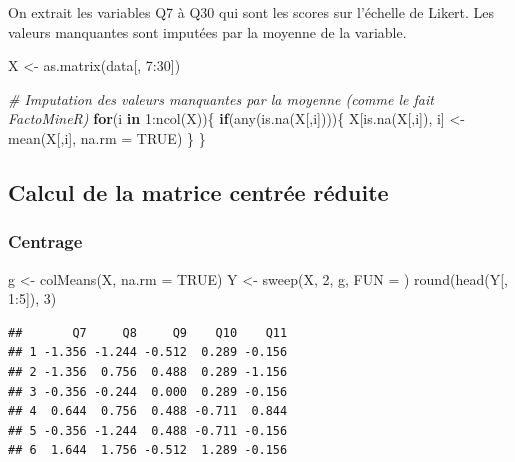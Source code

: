 \documentclass[
]{article}
\newenvironment{Shaded}{\begin{snugshade}}{\end{snugshade}}
\newcommand{\AttributeTok}[1]{\textcolor[rgb]{0.77,0.63,0.00}{#1}}
\newcommand{\CommentTok}[1]{\textcolor[rgb]{0.56,0.35,0.01}{\textit{#1}}}
\newcommand{\ConstantTok}[1]{\textcolor[rgb]{0.00,0.00,0.00}{#1}}
\newcommand{\ControlFlowTok}[1]{\textcolor[rgb]{0.13,0.29,0.53}{\textbf{#1}}}
\newcommand{\DecValTok}[1]{\textcolor[rgb]{0.00,0.00,0.81}{#1}}
\newcommand{\FunctionTok}[1]{\textcolor[rgb]{0.00,0.00,0.00}{#1}}
\newcommand{\NormalTok}[1]{#1}
\newcommand{\OtherTok}[1]{\textcolor[rgb]{0.56,0.35,0.01}{#1}}
\newcommand{\SpecialCharTok}[1]{\textcolor[rgb]{0.00,0.00,0.00}{#1}}
\newcommand{\StringTok}[1]{\textcolor[rgb]{0.31,0.60,0.02}{#1}}
\begin{document}
On extrait les variables Q7 à Q30 qui sont les scores sur l'échelle de
Likert. Les valeurs manquantes sont imputées par la moyenne de la
variable.

\begin{Shaded}
\begin{Highlighting}[]
\NormalTok{X }\OtherTok{\textless{}{-}} \FunctionTok{as.matrix}\NormalTok{(data[, }\DecValTok{7}\SpecialCharTok{:}\DecValTok{30}\NormalTok{])}

\CommentTok{\# Imputation des valeurs manquantes par la moyenne (comme le fait FactoMineR)}
\ControlFlowTok{for}\NormalTok{(i }\ControlFlowTok{in} \DecValTok{1}\SpecialCharTok{:}\FunctionTok{ncol}\NormalTok{(X))\{}
  \ControlFlowTok{if}\NormalTok{(}\FunctionTok{any}\NormalTok{(}\FunctionTok{is.na}\NormalTok{(X[,i])))\{}
\NormalTok{    X[}\FunctionTok{is.na}\NormalTok{(X[,i]), i] }\OtherTok{\textless{}{-}} \FunctionTok{mean}\NormalTok{(X[,i], }\AttributeTok{na.rm =} \ConstantTok{TRUE}\NormalTok{)}
\NormalTok{  \}}
\NormalTok{\}}
\end{Highlighting}
\end{Shaded}

\hypertarget{calcul-de-la-matrice-centruxe9e-ruxe9duite}{%
\subsection{Calcul de la matrice centrée
réduite}\label{calcul-de-la-matrice-centruxe9e-ruxe9duite}}

\hypertarget{centrage}{%
\subsubsection{Centrage}\label{centrage}}

\begin{Shaded}
\begin{Highlighting}[]
\NormalTok{g }\OtherTok{\textless{}{-}} \FunctionTok{colMeans}\NormalTok{(X, }\AttributeTok{na.rm =} \ConstantTok{TRUE}\NormalTok{)}
\NormalTok{Y }\OtherTok{\textless{}{-}} \FunctionTok{sweep}\NormalTok{(X, }\DecValTok{2}\NormalTok{, g, }\AttributeTok{FUN =} \StringTok{\textquotesingle{}{-}\textquotesingle{}}\NormalTok{)}
\FunctionTok{round}\NormalTok{(}\FunctionTok{head}\NormalTok{(Y[, }\DecValTok{1}\SpecialCharTok{:}\DecValTok{5}\NormalTok{]), }\DecValTok{3}\NormalTok{)}
\end{Highlighting}
\end{Shaded}

\begin{verbatim}
##       Q7     Q8     Q9    Q10    Q11
## 1 -1.356 -1.244 -0.512  0.289 -0.156
## 2 -1.356  0.756  0.488  0.289 -1.156
## 3 -0.356 -0.244  0.000  0.289 -0.156
## 4  0.644  0.756  0.488 -0.711  0.844
## 5 -0.356 -1.244  0.488 -0.711 -0.156
## 6  1.644  1.756 -0.512  1.289 -0.156
\end{verbatim}
\end{document}
